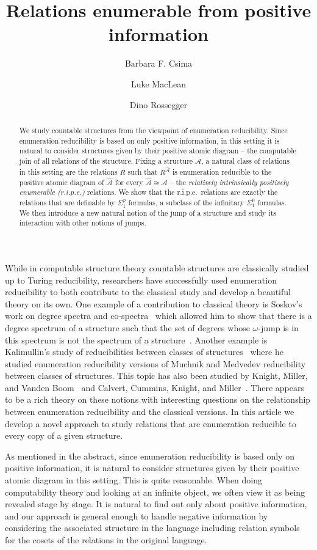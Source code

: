 \documentclass[11pt]{amsart}
\title{Relations enumerable from positive information}
\author{Barbara F. Csima}
\author{Luke MacLean}
\author{Dino Rossegger}
\newcommand{\A}{{\mathcal{A}}}
\begin{document}
\begin{abstract}
    We study countable structures from the viewpoint of enumeration reducibility. Since enumeration reducibility is based on only positive information, in this setting it is natural to consider structures given by their positive atomic diagram -- the computable join of all relations of the structure. Fixing a structure $\A$, a natural class of relations in this setting are the relations $R$ such that $R^{\hat \A}$ is enumeration reducible to the positive atomic diagram of $\hat \A$ for every $\hat \A\cong \A$ -- the \emph{relatively intrinsically positively enumerable (r.i.p.e.)} relations. We show that the r.i.p.e.\ relations are exactly the relations that are definable by $\Sigma^p_1$ formulas, a subclass of the infinitary $\Sigma^0_1$ formulas. We then introduce a new natural notion of the jump of a structure and study its interaction with other notions of jumps.
\end{abstract}
\maketitle
While in computable structure theory countable structures are classically studied up to Turing reducibility, researchers have successfully used enumeration reducibility to both contribute to the classical study and develop a beautiful theory on its own. One example of a contribution to classical theory is Soskov's work on degree spectra and co-spectra~\cite{soskov2004} which allowed him to show that there is a degree spectrum of a structure such that the set of degrees whose $\omega$-jump is in this spectrum is not the spectrum of a structure~\cite{soskov2013a}. Another example is Kalimullin's  study of reducibilities between classes of structures~\cite{kalimullin2012} where he studied enumeration reducibility versions of Muchnik and Medvedev reducibility between classes of structures. This topic has also been studied by Knight, Miller, and Vanden Boom~\cite{knight2007} and Calvert, Cummins, Knight, and Miller~\cite{calvert2004a}. There appears to be a rich theory on these notions with interesting questions on the relationship between enumeration reducibility and the classical versions. In this article we develop a novel approach to study relations that are enumeration reducible to every copy of a given structure.

As mentioned in the abstract, since enumeration reducibility is based only on positive information, it is natural to consider structures given by their positive atomic diagram in this setting. This is quite reasonable. When doing computability theory and looking at an infinite object, we often view it as being revealed stage by stage. It is natural to find out only about positive information, and our approach is general enough to handle negative information by considering the associated structure in the language including relation symbols for the cosets of the relations in the original language.
\end{document}
